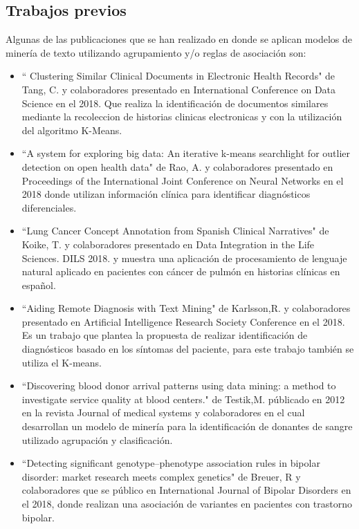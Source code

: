 \subsection*{Trabajos previos}

Algunas de las publicaciones que se han realizado en donde se aplican modelos de minería de texto utilizando agrupamiento y/o reglas de asociación son:

\begin{itemize}
	\item ``
	Clustering Similar Clinical Documents in Electronic Health Records" de Tang, C. y colaboradores presentado en International Conference on Data Science en el 2018. Que realiza la identificación de documentos similares mediante la recoleccion de historias clinicas electronicas y con la utilización del algoritmo K-Means. 
	
	\item ``A system for exploring big data: An iterative k-means searchlight for outlier detection on open health data" de Rao, A. y colaboradores presentado en Proceedings of the International Joint Conference on Neural Networks en el 2018 donde utilizan información clínica para identificar diagnósticos diferenciales.  
	
	\item ``Lung Cancer Concept Annotation from Spanish Clinical Narratives" de Koike, T. y colaboradores presentado en  Data Integration in the Life Sciences. DILS 2018. y muestra una aplicación de procesamiento de lenguaje natural aplicado en pacientes con cáncer de pulmón en historias clínicas en español.
	
	\item ``Aiding Remote Diagnosis with Text Mining" de Karlsson,R. y colaboradores presentado en Artificial Intelligence Research Society Conference en el 2018. Es un trabajo que plantea la propuesta de realizar identificación de diagnósticos basado en los síntomas del paciente, para este trabajo también se utiliza el K-means.
	
	\item ``Discovering blood donor arrival patterns using data mining: a method to investigate service quality at blood centers."  de Testik,M. públicado en 2012 en la revista  Journal of medical systems y colaboradores en el cual desarrollan un modelo de minería para la identificación de donantes de sangre utilizado agrupación y clasificación.
	
	\item ``Detecting significant genotype–phenotype association rules in bipolar disorder: market research meets complex genetics" de Breuer, R y colaboradores que se público  en International Journal of Bipolar Disorders en el 2018, donde realizan una asociación de variantes en pacientes con trastorno bipolar.

\end{itemize}



